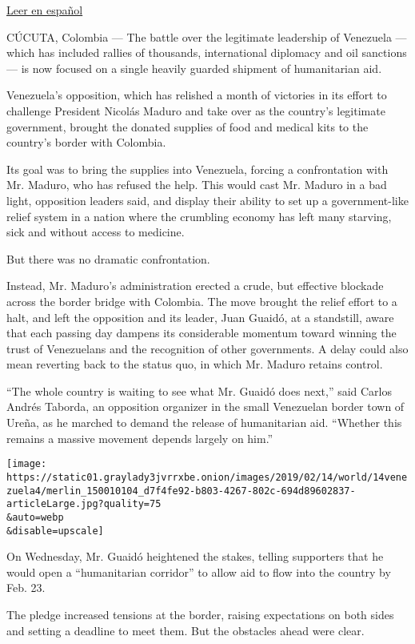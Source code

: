 \href{https://www.nytimes3xbfgragh.onion/es/2019/02/14/venezuela-frontera-ayuda-humanitaria/}{Leer
en español}

CÚCUTA, Colombia --- The battle over the legitimate leadership of
Venezuela --- which has included rallies of thousands, international
diplomacy and oil sanctions --- is now focused on a single heavily
guarded shipment of humanitarian aid.

Venezuela's opposition, which has relished a month of victories in its
effort to challenge President Nicolás Maduro and take over as the
country's legitimate government, brought the donated supplies of food
and medical kits to the country's border with Colombia.

Its goal was to bring the supplies into Venezuela, forcing a
confrontation with Mr. Maduro, who has refused the help. This would cast
Mr. Maduro in a bad light, opposition leaders said, and display their
ability to set up a government-like relief system in a nation where the
crumbling economy has left many starving, sick and without access to
medicine.

But there was no dramatic confrontation.

Instead, Mr. Maduro's administration erected a crude, but effective
blockade across the border bridge with Colombia. The move brought the
relief effort to a halt, and left the opposition and its leader, Juan
Guaidó, at a standstill, aware that each passing day dampens its
considerable momentum toward winning the trust of Venezuelans and the
recognition of other governments. A delay could also mean reverting back
to the status quo, in which Mr. Maduro retains control.

``The whole country is waiting to see what Mr. Guaidó does next,'' said
Carlos Andrés Taborda, an opposition organizer in the small Venezuelan
border town of Ureña, as he marched to demand the release of
humanitarian aid. ``Whether this remains a massive movement depends
largely on him.''

\texttt{[image: https://static01.graylady3jvrrxbe.onion/images/2019/02/14/world/14venezuela4/merlin\_150010104\_d7f4fe92-b803-4267-802c-694d89602837-articleLarge.jpg?quality=75\\\&auto=webp\\\&disable=upscale]}

On Wednesday, Mr. Guaidó heightened the stakes, telling supporters that
he would open a ``humanitarian corridor'' to allow aid to flow into the
country by Feb. 23.

The pledge increased tensions at the border, raising expectations on
both sides and setting a deadline to meet them. But the obstacles ahead
were clear.

